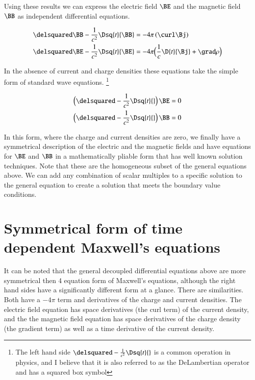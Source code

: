 \documentclass{article}      %
\begin{document}
Using these results we can express the 
electric field $\BE$ and the
magnetic field $\BB$
as independent differential equations.

\begin{align*}
\delsquared \BB - \frac{1}{c^2} \Dsq{t}{\BB} &= - 4\pi \left(\curl \Bj\right) \\
\delsquared \BE - \frac{1}{c^2} \Dsq{t}{\BE} &= - 4\pi \Bigl(\frac{1}{c} \D{t}{\Bj} + \grad \rho\Bigr)
\end{align*}

In the absence of current and charge densities these equations take the simple form of standard wave
equations.
\footnote{
The left hand side 
$
\delsquared - \frac{1}{c^2}\Dsq{t}{}
$
is a common operation in physics, and I believe that 
it is also referred to as the DeLambertian operator and has a squared box symbol
}

\begin{align*}
\Bigl(\delsquared - \frac{1}{c^2} \Dsq{t}{} \Bigr) \, \BE &= 0 \\
\Bigl(\delsquared - \frac{1}{c^2} \Dsq{t}{} \Bigr) \, \BB &= 0
\end{align*}

In this form, where the charge and current densities are zero, we finally have 
a symmetrical description of the electric and the magnetic fields and have equations 
for $\BE$ and $\BB$ in a mathematically pliable form that has well known 
solution techniques.
Note that these are the homogeneous subset of the general equations above.
We can add any combination of scalar multiples to a specific solution 
to the general equation to create a solution that meets the boundary 
value conditions.

\section{Symmetrical form of time dependent Maxwell's equations}

It can 
be noted that the general decoupled differential equations above are more 
symmetrical then 4 equation form of Maxwell's equations, although the
right hand sides have a significantly different form at a glance.  There
are similarities.  Both have a $-4\pi$ term and derivatives of the charge and
current densities.  The electric field equation has space derivatives (the curl term) of 
the current density, and the the magnetic field equation has space derivatives of 
the charge density (the gradient term) as well as a time derivative of the current
density.
\end{document}

